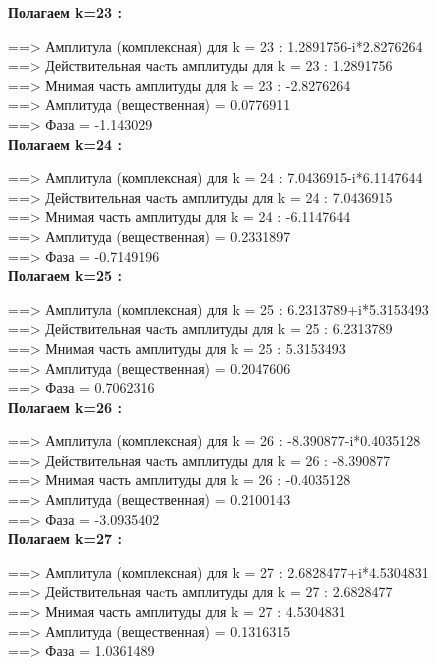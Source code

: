 \documentclass[a4paper,11pt]{article}
\begin{document}
\begin{flushleft}
\textbf{Полагаем k=23 :\\} 

 ==> Амплитула (комплексная) для k = 23 :  1.2891756-i*2.8276264\\ 
 ==> Действительная чаcть амплитуды  для k = 23 : 1.2891756\\ 
 ==> Мнимая часть амплитуды  для k = 23 : -2.8276264\\ 
 ==> Амплитуда (вещественная) = 0.0776911\\ 
 ==> Фаза = -1.143029\\ 

\textbf{Полагаем k=24 :\\ }

 ==> Амплитула (комплексная) для k = 24 :  7.0436915-i*6.1147644\\ 
 ==> Действительная чаcть амплитуды  для k = 24 : 7.0436915\\ 
 ==> Мнимая часть амплитуды  для k = 24 : -6.1147644\\ 
 ==> Амплитуда (вещественная) = 0.2331897\\ 
 ==> Фаза = -0.7149196\\ 

\textbf{Полагаем k=25 :\\} 

 ==> Амплитула (комплексная) для k = 25 :  6.2313789+i*5.3153493\\ 
 ==> Действительная чаcть амплитуды  для k = 25 : 6.2313789\\ 
 ==> Мнимая часть амплитуды  для k = 25 : 5.3153493\\ 
 ==> Амплитуда (вещественная) = 0.2047606\\ 
 ==> Фаза = 0.7062316\\ 

\textbf{Полагаем k=26 :\\} 

 ==> Амплитула (комплексная) для k = 26 : -8.390877-i*0.4035128\\ 
 ==> Действительная чаcть амплитуды  для k = 26 : -8.390877\\ 
 ==> Мнимая часть амплитуды  для k = 26 : -0.4035128\\ 
 ==> Амплитуда (вещественная) = 0.2100143\\ 
 ==> Фаза = -3.0935402\\ 

\textbf{Полагаем k=27 :\\} 

 ==> Амплитула (комплексная) для k = 27 :  2.6828477+i*4.5304831\\ 
 ==> Действительная чаcть амплитуды  для k = 27 : 2.6828477\\ 
 ==> Мнимая часть амплитуды  для k = 27 : 4.5304831\\ 
 ==> Амплитуда (вещественная) = 0.1316315\\ 
 ==> Фаза = 1.0361489\\ 


\end{flushleft}
\end{document}
